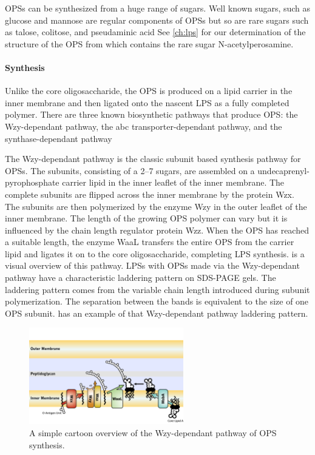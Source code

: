 \Acp{OPS} can be synthesized from a huge range of sugars. Well known sugars,
such as glucose and mannose are regular components of \acp{OPS} but so are rare
sugars such as talose, colitose, and pseudaminic acid
See \cref{ch:lps} for our determination of the structure of the \ac{OPS} from
\caulobacter which contains the rare sugar N-acetylperosamine.

    \paragraph{Synthesis}
    Unlike the core oligosaccharide, the \ac{OPS} is produced on a lipid carrier in the inner membrane and then ligated onto the nascent \ac{LPS} as a fully completed polymer.
 There are three known biosynthetic pathways that produce \ac{OPS}: the Wzy-dependant pathway, the \ac{abc} transporter-dependant pathway, and the synthase-dependant pathway

The Wzy-dependant pathway is the classic subunit based synthesis pathway for \acp{OPS}. The subunits, consisting of a 2--7 sugars, are assembled on a undecaprenyl-pyrophosphate carrier lipid in the inner leaflet of the inner membrane. The complete subunits are flipped across the inner membrane by the protein Wzx. The subunits are then polymerized by the enzyme Wzy in the outer leaflet of the inner membrane. The length of the growing \ac{OPS} polymer can vary but it is influenced by the chain length regulator protein Wzz. When the \ac{OPS} has reached a suitable length, the enzyme WaaL transfers the entire \ac{OPS} from the carrier lipid and ligates it on to the core oligosaccharide, completing \ac{LPS} synthesis.  is a visual overview of this pathway. \Acp{LPS} with \acp{OPS} made via the Wzy-dependant pathway have a characteristic laddering pattern on \ac{SDS-PAGE} gels. The laddering pattern comes from the variable chain length introduced during subunit polymerization. The separation between the bands is equivalent to the size of one \ac{OPS} subunit.  has an example of that Wzy-dependant pathway laddering pattern.

\begin{figure}[htb]
  	\begin{center}
   		\includegraphics[width=0.6\textwidth]{intro/img/lpswzy.pdf}
   	\end{center}
   	\caption[A simple overview of the Wzy-dependant pathway]{
A simple cartoon overview of the Wzy-dependant pathway of \ac{OPS} synthesis.
}
\label{fig:lpswzy}
\end{figure}   

